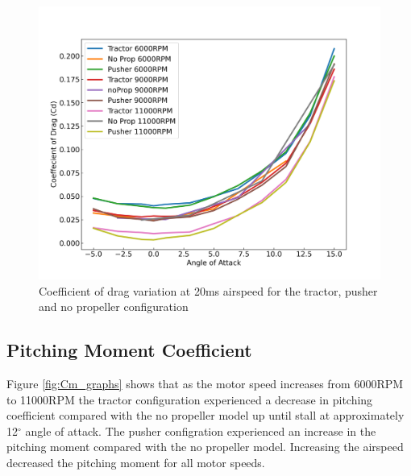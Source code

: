 \begin{figure}[H]
    \centering
    \includegraphics[scale = 0.7]{05_Results/Figs/Cd/20ms_Cd.png}
    \caption{Coefficient of drag variation at 20ms airspeed for the tractor, pusher and no propeller configuration}
    \label{fig:Cd_20ms}
\end{figure}

\subsection{Pitching Moment Coefficient}

Figure \ref{fig:Cm_graphs} shows that as the motor speed increases from 6000RPM to 11000RPM the tractor configuration experienced a decrease in pitching coefficient compared with the no propeller model up until stall at approximately 12$^\circ$ angle of attack. The pusher configration experienced an increase in the pitching moment compared with the no propeller model. Increasing the airspeed decreased the pitching moment for all motor speeds.

